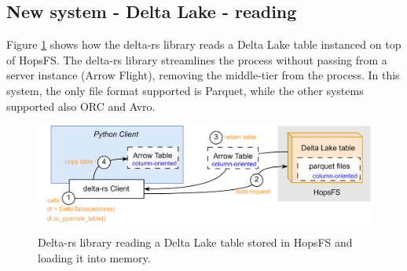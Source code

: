 \subsection{New system - Delta Lake - reading}
\label{subsec:back_sys_delta_read}

Figure \ref{fig:delta_read} shows how the delta-rs library reads a Delta Lake table instanced on top of \gls{HopsFS}. The delta-rs library streamlines the process without passing from a server instance (Arrow Flight), removing the middle-tier from the process. In this system, the only file format supported is Parquet, while the other systems supported also ORC and Avro.

\begin{figure}
    \begin{center}
      \includegraphics[width=\textwidth]{figures/2-background_and_related_work/delta_read.png}
    \end{center}
    \caption[New system - Delta Lake - read process]{Delta-rs library reading a Delta Lake table stored in \gls{HopsFS} and loading it into memory.}
    \label{fig:delta_read}
\end{figure}